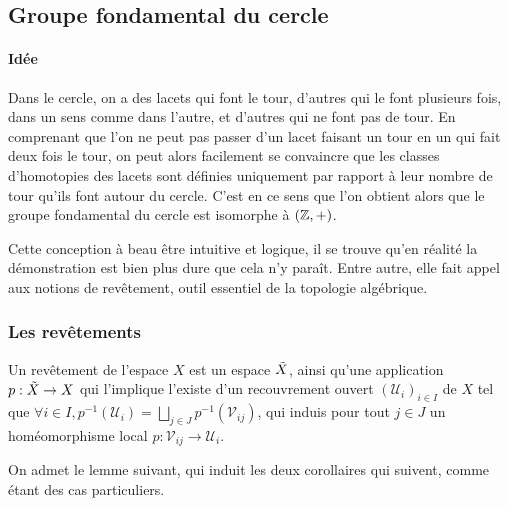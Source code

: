 \documentclass[hidelinks, 10pt]{article}
\begin{document}
\subsection{Groupe fondamental du cercle}

\paragraph{Idée} Dans le cercle, on a des lacets qui font le tour, d'autres qui le font plusieurs fois, dans un sens comme dans l'autre, et d'autres qui ne font pas de tour. En comprenant que l'on ne peut pas passer d'un lacet faisant un tour en un qui fait deux fois le tour, on peut alors facilement se convaincre que les classes d'homotopies des lacets sont définies uniquement par rapport à leur nombre de tour qu'ils font autour du cercle. C'est en ce sens que l'on obtient alors que le groupe fondamental du cercle est isomorphe à $(\mathbb{Z},+)$.

Cette conception à beau être intuitive et logique, il se trouve qu'en réalité la démonstration est bien plus dure que cela n'y paraît. Entre autre, elle fait appel aux notions de revêtement, outil essentiel de la topologie algébrique.

\subsubsection{Les revêtements}

\begin{definition}
Un revêtement de l'espace $X$ est un espace $\Tilde{X}$, ainsi qu'une application $p:\Tilde{X}\rightarrow X$ qui l'implique l'existe d'un recouvrement ouvert $(\mathcal{U}_i)_{i\in I}$ de $X$ tel que $\forall i\in I, p^{-1}(\mathcal{U}_i)=\bigsqcup_{j\in J} p^{-1}(\mathcal{V}_{ij})$, qui induis pour tout $j\in J$ un homéomorphisme local $p:\mathcal{V}_{ij}\rightarrow\mathcal{U}_i$.
\end{definition}

On admet le lemme suivant, qui induit les deux corollaires qui suivent, comme étant des cas particuliers.
\end{document}
